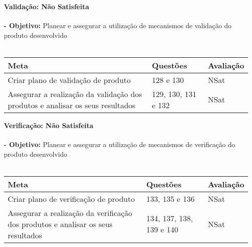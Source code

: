 \documentclass[openany,10pt,a4paper]{article}
\begin{document}
\textbf{Validação: Não Satisfeita} \\  \\
\textbf{- Objetivo:} Planear e assegurar a utilização de mecanismos de validação do produto desenvolvido \\
\\
\begin{tabular}{p{3in}|p{1.5in}|p{1.5in}}		
\textbf{Meta} & \textbf{Questões} & \textbf{Avaliação} \\ \hline
Criar plano de validação de produto & 128 e 130 & NSat \\
Assegurar a realização da validação dos produtos e analisar os seus resultados & 129, 130, 131 e 132 & NSat \\
\end{tabular}

\textbf{Verificação: Não Satisfeita} \\  \\
\textbf{- Objetivo:} Planear e assegurar a utilização de mecanismos de verificação do produto desenvolvido \\
\\
\begin{tabular}{p{3in}|p{1.5in}|p{1.5in}}		
\textbf{Meta} & \textbf{Questões} & \textbf{Avaliação} \\ \hline
Criar plano de verificação de produto & 133, 135 e 136 & NSat \\
Assegurar a realização da verificação dos produtos e analisar os seus resultados & 134, 137, 138, 139 e 140 & NSat \\
\end{tabular}
\end{document}
